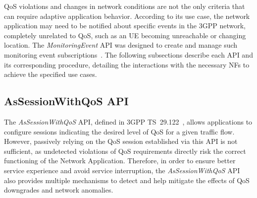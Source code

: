 \acs{QoS} violations and changes in network conditions are not the only criteria that can require adaptive application behavior. According to its use case, the network application may need to be notified about specific events in the \acs{3GPP} network, completely unrelated to \acs{QoS}, such as an \acs{UE} becoming unreachable or changing location. The \textit{MonitoringEvent} \acs{API} was designed to create and manage such monitoring event subscriptions~\cite{ETSI_TS_129_122_V18_8_0}. The following subsections describe each \acs{API} and its corresponding procedure, detailing the interactions with the necessary \acsp{NF} to achieve the specified use cases.


\subsection{AsSessionWithQoS \acs{API}}
\label{chap:proposal:nef:AsSessionWithQoS}

The \textit{AsSessionWithQoS} \acs{API}, defined in \acs{3GPP} TS~29.122~\cite{ETSI_TS_129_122_V18_8_0}, allows applications to configure sessions indicating the desired level of \acs{QoS} for a given traffic flow. However, passively relying on the \acs{QoS} session established via this \acs{API} is not sufficient, as undetected violations of \acs{QoS} requirements directly risk the correct functioning of the Network Application. Therefore, in order to ensure better service experience and avoid service interruption, the \textit{AsSessionWithQoS} \acs{API} also provides multiple mechanisms to detect and help mitigate the effects of \acs{QoS} downgrades and network anomalies.

